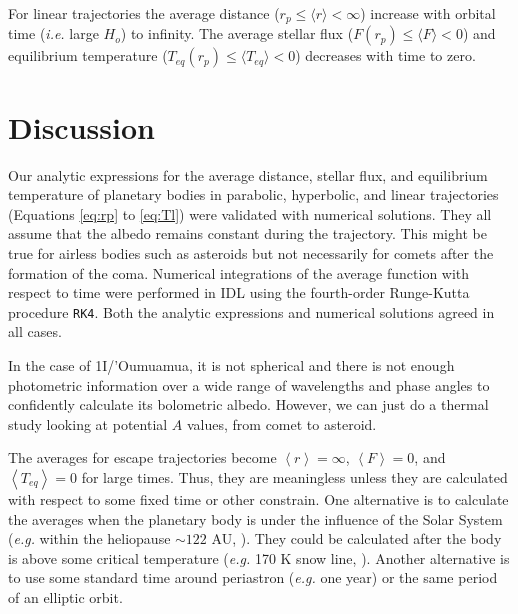 \documentclass[a4paper,fleqn,usenatbib]{mnras}
\begin{document}

For linear trajectories the average distance ($r_p \leq \langle r \rangle < \infty$) increase with orbital time (\emph{i.e.} large $H_o$) to infinity. The average stellar flux ($F(r_p) \leq \langle F \rangle < 0$) and equilibrium temperature ($T_{eq}(r_p) \leq \langle T_{eq} \rangle < 0$) decreases with time to zero.


\section{Discussion}
\label{sec:discussion}


Our analytic expressions for the average distance, stellar flux, and equilibrium temperature of planetary bodies in parabolic, hyperbolic, and linear trajectories (Equations \ref{eq:rp} to \ref{eq:Tl}) were validated with numerical solutions. They all assume that the albedo remains constant during the trajectory. This might be true for airless bodies such as asteroids but not necessarily for comets after the formation of the coma. Numerical integrations of the average function with respect to time were performed in IDL using the fourth-order Runge-Kutta procedure \texttt{RK4}. Both the analytic expressions and numerical solutions agreed in all cases.


In the case of 1I/'Oumuamua, it is not spherical and there is not enough photometric information over a wide range of wavelengths and phase angles to confidently calculate its bolometric albedo. However, we can just do a thermal study looking at potential $A$ values, from comet to asteroid.


The averages for escape trajectories become $\left<r\right>=\infty$, $\left<F\right>=0$, and $\left<T_{eq}\right>=0$ for large times. Thus, they are meaningless unless they are calculated with respect to some fixed time or other constrain. One alternative is to calculate the averages when the planetary body is under the influence of the Solar System (\emph{e.g.} within the heliopause $\sim122$ AU, \citet{2017ApJ...834..197C}). They could be calculated after the body is above some critical temperature (\emph{e.g.} 170 K snow line, \citet{2008ApJ...673..502K}). Another alternative is to use some standard time around periastron (\emph{e.g.} one year) or the same period of an elliptic orbit.
\end{document}
